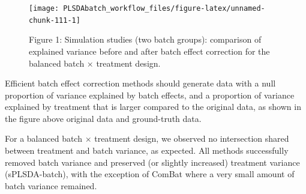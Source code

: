\documentclass[
]{book}
\begin{document}
\begin{figure}

{\centering \texttt{[image: PLSDAbatch\_workflow\_files/figure-latex/unnamed-chunk-111-1]} 

}

\caption{Figure 1: Simulation studies (two batch groups): comparison of explained variance before and after batch effect correction for the balanced batch × treatment design.}\label{fig:unnamed-chunk-111}
\end{figure}

Efficient batch effect correction methods should generate data with a null proportion of variance explained by batch effects, and a proportion of variance explained by treatment that is larger compared to the original data, as shown in the figure above original data and ground-truth data.

For a balanced batch \(\times\) treatment design, we observed no intersection shared between treatment and batch variance, as expected. All methods successfully removed batch variance and preserved (or slightly increased) treatment variance (sPLSDA-batch), with the exception of ComBat where a very small amount of batch variance remained.
\end{document}
